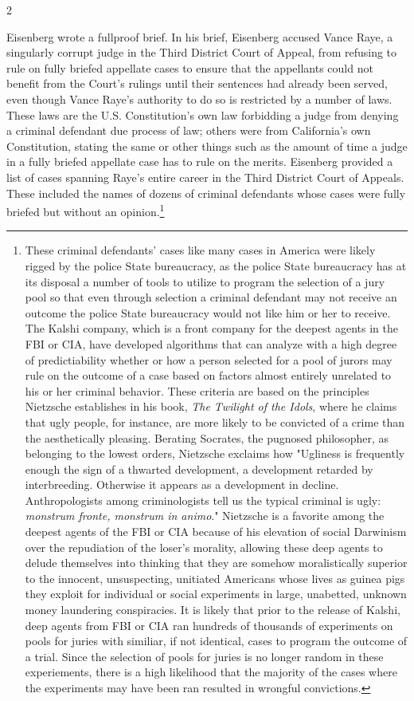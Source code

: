 \documentclass[10pt,a4paper,twoside]{article} %
\begin{document}
\begin{multicols}{2}
{Eisenberg wrote a fullproof brief. In his brief, Eisenberg accused Vance Raye, a singularly corrupt judge in the Third District Court of Appeal, from refusing to rule on fully briefed appellate cases to ensure that the appellants could not benefit from the Court's rulings until their sentences had already been served, even though Vance Raye's authority to do so is restricted by a number of laws. These laws are the U.S. Constitution's own law forbidding a judge from denying a criminal defendant due process of law; others were from California's own Constitution, stating the same or other things such as the amount of time a judge in a fully briefed appellate case has to rule on the merits. Eisenberg provided a list of cases spanning Raye's entire career in the Third District Court of Appeals. These included the names of dozens of criminal defendants whose cases were fully briefed but without an opinion.\footnote{These criminal defendants' cases like many cases in America were likely rigged by the police State bureaucracy, as the police State bureaucracy has at its disposal a number of tools to utilize to program the selection of a jury pool so that even through selection a criminal defendant may not receive an outcome the police State bureaucracy would not like him or her to receive. The Kalshi company, which is a front company for the deepest agents in the FBI or CIA, have developed algorithms that can analyze with a high degree of predictiability whether or how a person selected for a pool of jurors may rule on the outcome of a case based on factors almost entirely unrelated to his or her criminal behavior. These criteria are based on the principles Nietzsche establishes in his book, \emph{The Twilight of the Idols}, where he claims that ugly people, for instance, are more likely to be convicted of a crime than the aesthetically pleasing. Berating Socrates, the pugnosed philosopher, as belonging to the lowest orders, Nietzsche exclaims how "Ugliness is frequently enough the sign of a thwarted development, a development retarded by interbreeding.  Otherwise it appears as a development in decline. Anthropologists among criminologists tell us the typical criminal is ugly: \emph{monstrum fronte, monstrum in animo}." Nietzsche is a favorite among the deepest agents of the FBI or CIA because of his elevation of social Darwinism over the repudiation of the loser's morality, allowing these deep agents to delude themselves into thinking that they are somehow moralistically superior to the innocent, unsuspecting, unitiated Americans whose lives as guinea pigs they exploit for individual or social experiments in large, unabetted, unknown money laundering conspiracies. It is likely that prior to the release of Kalshi, deep agents from FBI or CIA ran hundreds of thousands of experiments on pools for juries with similiar, if not identical, cases to program the outcome of a trial. Since the selection of pools for juries is no longer random in these experiements, there is a high likelihood that the majority of the cases where the experiments may have been ran resulted in wrongful convictions. }


}
\end{multicols}
\end{document}
